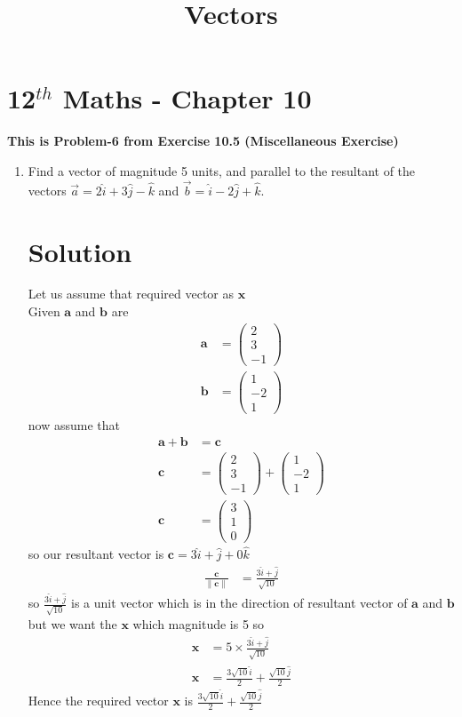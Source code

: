 \documentclass[12pt]{article}
\newcommand{\myvec}[1]{\ensuremath{\begin{pmatrix}#1\end{pmatrix}}}
\providecommand{\norm}[1]{\left\lVert#1\right\rVert}
\let\vec\mathbf
\begin{document}
\begin{center}
\title{\textbf{  Vectors}}
\date{\vspace{-5ex}} %
\maketitle
\end{center}
\setcounter{page}{1}\section{12$^{th}$ Maths - Chapter 10}
\textbf{This is Problem-6 from Exercise 10.5 (Miscellaneous Exercise)}
\begin{enumerate}

\item Find a vector of magnitude 5 units, and parallel to the resultant of the vectors $\overrightarrow{a}=2\hat{i}+3\hat{j}-\hat{k}$ and $\overrightarrow{b}=
\hat{i}-2\hat{j}+\hat{k}.$
\section{Solution}
Let us assume that required vector as $\vec{x}$\\ 
Given $\vec{a}$ and $\vec{b}$ are
\begin{align}
\vec{a}&=\myvec{2\\3\\-1}\\
\vec{b}&=\myvec{1\\-2\\1}
\end{align}
now assume that
\begin{align}
\vec{a}+\vec{b}&= \vec{c}\\
\vec{c}&= \myvec{2\\3\\-1}+\myvec{1\\-2\\1}\\
\vec{c}&=\myvec{3\\1\\0}
\end{align}
so our resultant vector is $\vec{c}=3\hat{i}+\hat{j}+0\hat{k}$\\
\begin{align}
 \frac{\vec{c}}{\norm{\vec{c}}} &= \frac{3\hat{i}+\hat{j}}{\sqrt{10}}
\end{align}
so $\frac{3\hat{i}+\hat{j}}{\sqrt{10}}$ is a unit vector which is in the  direction of resultant vector of $\vec{a}$ and $\vec{b}$ but we want the $\vec{x}$ which  magnitude is  5 so 
\begin{align}
 \vec{x}&=5\times \frac{3\hat{i}+\hat{j}}{\sqrt{10}} \\
 \vec{x}&=\frac{3\sqrt{10}\hat{i}}{2}+\frac{\sqrt{10}\hat{j}}{2}
\end{align}
Hence the required vector $\vec{x}$ is $\frac{3\sqrt{10}\hat{i}}{2}+\frac{\sqrt{10}\hat{j}}{2}$
\end{enumerate} 
\end{document}
